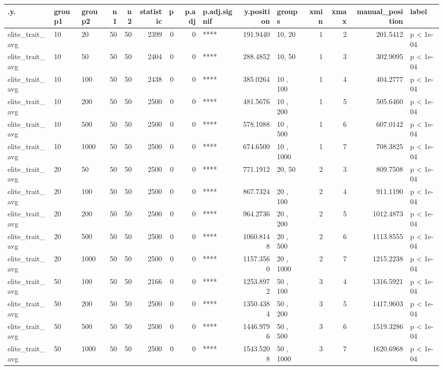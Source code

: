 \documentclass[]{book}
\begin{document}
\begin{tabular}{l|l|l|r|r|r|r|r|l|r|l|r|r|r|l}
\hline
.y. & group1 & group2 & n1 & n2 & statistic & p & p.adj & p.adj.signif & y.position & groups & xmin & xmax & manual\_position & label\\
\hline
elite\_trait\_avg & 10 & 20 & 50 & 50 & 2399 & 0 & 0 & **** & 191.9440 & 10, 20 & 1 & 2 & 201.5412 & p < 1e-04\\
\hline
elite\_trait\_avg & 10 & 50 & 50 & 50 & 2404 & 0 & 0 & **** & 288.4852 & 10, 50 & 1 & 3 & 302.9095 & p < 1e-04\\
\hline
elite\_trait\_avg & 10 & 100 & 50 & 50 & 2438 & 0 & 0 & **** & 385.0264 & 10 , 100 & 1 & 4 & 404.2777 & p < 1e-04\\
\hline
elite\_trait\_avg & 10 & 200 & 50 & 50 & 2500 & 0 & 0 & **** & 481.5676 & 10 , 200 & 1 & 5 & 505.6460 & p < 1e-04\\
\hline
elite\_trait\_avg & 10 & 500 & 50 & 50 & 2500 & 0 & 0 & **** & 578.1088 & 10 , 500 & 1 & 6 & 607.0142 & p < 1e-04\\
\hline
elite\_trait\_avg & 10 & 1000 & 50 & 50 & 2500 & 0 & 0 & **** & 674.6500 & 10  , 1000 & 1 & 7 & 708.3825 & p < 1e-04\\
\hline
elite\_trait\_avg & 20 & 50 & 50 & 50 & 2500 & 0 & 0 & **** & 771.1912 & 20, 50 & 2 & 3 & 809.7508 & p < 1e-04\\
\hline
elite\_trait\_avg & 20 & 100 & 50 & 50 & 2500 & 0 & 0 & **** & 867.7324 & 20 , 100 & 2 & 4 & 911.1190 & p < 1e-04\\
\hline
elite\_trait\_avg & 20 & 200 & 50 & 50 & 2500 & 0 & 0 & **** & 964.2736 & 20 , 200 & 2 & 5 & 1012.4873 & p < 1e-04\\
\hline
elite\_trait\_avg & 20 & 500 & 50 & 50 & 2500 & 0 & 0 & **** & 1060.8148 & 20 , 500 & 2 & 6 & 1113.8555 & p < 1e-04\\
\hline
elite\_trait\_avg & 20 & 1000 & 50 & 50 & 2500 & 0 & 0 & **** & 1157.3560 & 20  , 1000 & 2 & 7 & 1215.2238 & p < 1e-04\\
\hline
elite\_trait\_avg & 50 & 100 & 50 & 50 & 2166 & 0 & 0 & **** & 1253.8972 & 50 , 100 & 3 & 4 & 1316.5921 & p < 1e-04\\
\hline
elite\_trait\_avg & 50 & 200 & 50 & 50 & 2500 & 0 & 0 & **** & 1350.4384 & 50 , 200 & 3 & 5 & 1417.9603 & p < 1e-04\\
\hline
elite\_trait\_avg & 50 & 500 & 50 & 50 & 2500 & 0 & 0 & **** & 1446.9796 & 50 , 500 & 3 & 6 & 1519.3286 & p < 1e-04\\
\hline
elite\_trait\_avg & 50 & 1000 & 50 & 50 & 2500 & 0 & 0 & **** & 1543.5208 & 50  , 1000 & 3 & 7 & 1620.6968 & p < 1e-04\\

\end{tabular}
\end{document}
